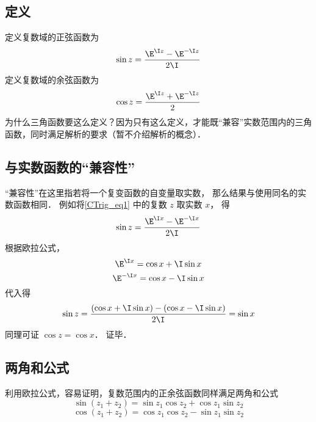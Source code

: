 
\subsection{定义}
定义复数域的正弦函数为
\begin{equation}\label{CTrig_eq1}
\sin z = \frac{\E^{\I z} - \E^{-\I z}}{2\I}
\end{equation}
定义复数域的余弦函数为
\begin{equation}\label{CTrig_eq2}
\cos z = \frac{\E^{\I z} + \E^{-\I z}}{2}
\end{equation}
为什么三角函数要这么定义？因为只有这么定义，才能既“兼容”实数范围内的三角函数，同时满足解析的要求（暂不介绍解析的概念）．

\subsection{与实数函数的“兼容性”}
“兼容性”在这里指若将一个复变函数的自变量取实数， 那么结果与使用同名的实数函数相同． 例如将\autoref{CTrig_eq1} 中的复数 $z$ 取实数 $x$， 得
\begin{equation}
\sin z = \frac{\E^{\I x} - \E^{-\I x}}{2\I}
\end{equation} 
根据欧拉公式，
\begin{equation}
\E^{\I x} = \cos x + \I\sin x
\end{equation} 
\begin{equation}
\E^{-\I x} = \cos x - \I \sin x
\end{equation} 
代入得
\begin{equation}
\sin z = \frac{(\cos x + \I\sin x) - (\cos x - \I\sin x)}{2\I} = \sin x
\end{equation}  
同理可证 $\cos z = \cos x$． 证毕．

\subsection{两角和公式}
利用欧拉公式，容易证明，复数范围内的正余弦函数同样满足两角和公式
\begin{equation}\label{CTrig_eq3}
\sin(z_1 + z_2) = \sin {z_1}\cos {z_2} + \cos {z_1}\sin {z_2}
\end{equation}
\begin{equation}\label{CTrig_eq4}
\cos (z_1 + z_2) = \cos {z_1}\cos {z_2} - \sin {z_1}\sin {z_2}
\end{equation}
